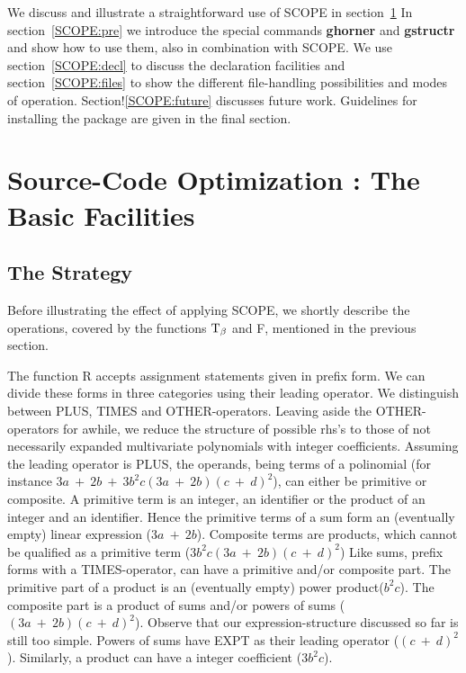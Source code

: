 We discuss and illustrate a straightforward use of SCOPE in
section~\ref{SCOPE:basic} In section~\ref{SCOPE:pre} we introduce the
special commands {\bf ghorner} and {\bf gstructr} and show how to use
them, also in combination with SCOPE.  We use section~\ref{SCOPE:decl} to
discuss the declaration facilities and section~\ref{SCOPE:files} to show
the different file-handling possibilities and modes of operation.
Section!\ref{SCOPE:future} discusses future work.  Guidelines for
installing the package are given in the final section.

\section{Source-Code Optimization : The Basic Facilities}\label{SCOPE:basic}
\subsection{The Strategy}

Before illustrating the effect of applying SCOPE, we shortly describe
the operations, covered by the functions ${{\rm T}}_{\beta}$ and F,
mentioned in the previous section.

The function R accepts assignment statements given in prefix form.  We
can divide these forms in three categories using their leading
operator. We distinguish between PLUS, TIMES and OTHER-operators.
Leaving aside the OTHER-operators for awhile, we reduce the structure
of possible rhs's to those of not necessarily expanded multivariate
polynomials with integer coefficients. Assuming the leading operator
is PLUS, the operands, being terms of a polinomial (for instance $3a\
+\ 2b\ +\ 3 {b^2} c (3a\ +\ 2b){(c\ +\ d)^2}$), can either be
primitive or composite.  A primitive term is an integer, an identifier
or the product of an integer and an identifier.  Hence the primitive
terms of a sum form an (eventually empty) linear expression ($3a\ +\
2b$).  Composite terms are products, which cannot be qualified as a
primitive term ($3 {b^2} c (3a\ +\ 2b) {(c\ +\ d)}^{2}$) Like sums,
\ttindex{TIMES}
prefix forms with a TIMES-operator, can have a primitive and/or
composite part. The primitive part of a product is an (eventually
empty) power product(${b^2} c$).  The composite part is a product of
sums and/or powers of sums ($(3a\ +\ 2b) {(c\ +\ d)^2}$).  Observe
that our expression-structure discussed so far is still too simple.
\ttindex{EXPT}
Powers of sums have EXPT as their leading operator (${(c\ +\
d)}^{2}$).  Similarly, a product can have a integer coefficient ($3
{b^2} c$).

